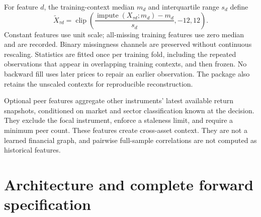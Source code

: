 \documentclass[11pt,a4paper]{article}
\newcommand{\clip}{\operatorname{clip}}
\begin{document}
For feature $d$, the training-context median $m_d$ and interquartile range $s_d$ define
\begin{equation}
\widetilde X_{\tau d}=\clip\!\left(\frac{\operatorname{impute}(X_{\tau d};m_d)-m_d}{s_d},-12,12\right).
\end{equation}
Constant features use unit scale; all-missing training features use zero median and are recorded. Binary missingness channels are preserved without continuous rescaling. Statistics are fitted once per training fold, including the repeated observations that appear in overlapping training contexts, and then frozen. No backward fill uses later prices to repair an earlier observation. The package also retains the unscaled contexts for reproducible reconstruction.

Optional peer features aggregate other instruments' latest available return snapshots, conditioned on market and sector classification known at the decision. They exclude the focal instrument, enforce a staleness limit, and require a minimum peer count. These features create cross-asset context. They are not a learned financial graph, and pairwise full-sample correlations are not computed as historical features.

\section{Architecture and complete forward specification}
\end{document}
